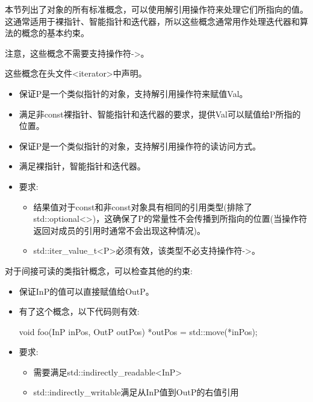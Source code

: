 
本节列出了对象的所有标准概念，可以使用解引用操作符来处理它们所指向的值。这通常适用于裸指针、智能指针和迭代器，所以这些概念通常用作处理迭代器和算法的概念的基本约束。

注意，这些概念不需要支持操作符->。

这些概念在头文件<iterator>中声明。



\begin{itemize}
\item
保证P是一个类似指针的对象，支持解引用操作符来赋值Val。

\item
满足非const裸指针、智能指针和迭代器的要求，提供Val可以赋值给P所指的位置。
\end{itemize}



\begin{itemize}
\item
保证P是一个类似指针的对象，支持解引用操作符的读访问方式。

\item
满足裸指针，智能指针和迭代器。


\item
要求:
\begin{itemize}
\item
结果值对于const和非const对象具有相同的引用类型(排除了std::optional<>)，这确保了P的常量性不会传播到所指向的位置(当操作符返回对成员的引用时通常不会出现这种情况)。

\item
std::iter\_value\_t<P>必须有效，该类型不必支持操作符->。
\end{itemize}
\end{itemize}


对于间接可读的类指针概念，可以检查其他的约束:


\begin{itemize}
\item
保证InP的值可以直接赋值给OutP。

\item
有了这个概念，以下代码则有效:

\begin{cpp}
void foo(InP inPos, OutP outPos) {
	*outPos = std::move(*inPos);
}
\end{cpp}

\item
要求:
\begin{itemize}
\item
需要满足std::indirectly\_readable<InP>

\item
std::indirectly\_writable满足从InP值到OutP的右值引用
\end{itemize}
\end{itemize}

